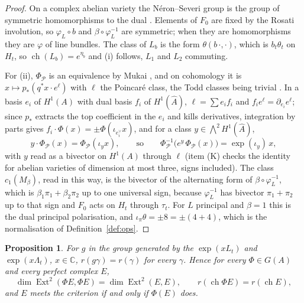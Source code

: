 \documentclass[11pt]{amsart}
\newtheorem{proposition}[theorem]{Proposition}
\theoremstyle{definition}
\theoremstyle{remark}
\newcommand{\CC}{\mathbb{C}}
\newcommand{\Av}{\widehat{A}}
\newcommand{\ch}{\operatorname{ch}}
\newcommand{\Ext}{\operatorname{Ext}}
\begin{document}
\begin{proof}
On a complex abelian variety the N\'eron--Severi group is the group of
symmetric homomorphisms to the dual \cite[\S2.5]{BL04}. Elements of $F_{0}$
are fixed by the Rosati involution, so $\varphi_{L}\circ b$ and
$\beta\circ\varphi_{L}^{-1}$ are symmetric; when they are homomorphisms they
are $\varphi$ of line bundles. The class of $L_{b}$ is the form
$\theta(b\,\cdot,\cdot)$, which is $b_{t}\theta_{t}$ on $H_{t}$, so
$\ch(L_{b})=e^{\eta_{b}}$ and (i) follows, $L_{1}$ and $L_{2}$ commuting.

For (ii), $\Phi_{\mathcal{P}}$ is an equivalence by Mukai \cite{Muk81}, and
on cohomology it is $x\mapsto p_{*}(q^{*}x\cdot e^{\ell})$ with $\ell$ the
Poincar\'e class, the Todd classes being trivial \cite[Proposition~6.1]{BMB}.
In a basis $e_{i}$ of $H^{1}(A)$ with dual basis $f_{i}$ of $H^{1}(\Av)$,
$\ell=\sum e_{i}f_{i}$ and $f_{i}e^{\ell}=\partial_{e_{i}}e^{\ell}$; since
$p_{*}$ extracts the top coefficient in the $e_{i}$ and kills derivatives,
integration by parts gives $f_{i}\cdot\Phi(x)=\pm\Phi(\iota_{e_{i}^{\vee}}x)$,
and for a class $y\in\bigwedge^{2}H^{1}(\Av)$,
\[
  y\cdot\Phi_{\mathcal{P}}(x)=\Phi_{\mathcal{P}}(\iota_{y}x),\qquad\text{so}\qquad
  \Phi_{\mathcal{P}}^{-1}\bigl(e^{y}\,\Phi_{\mathcal{P}}(x)\bigr)=\exp(\iota_{y})\,x ,
\]
with $y$ read as a bivector on $H^{1}(A)$ through $\ell$ (item (K) checks the
identity for abelian varieties of dimension at most three, signs included).
The class $c_{1}(M_{\beta})$, read in this way, is the bivector of the
alternating form of $\beta\circ\varphi_{L}^{-1}$, which is
$\beta_{1}\pi_{1}+\beta_{2}\pi_{2}$ up to one universal sign, because
$\varphi_{L}^{-1}$ has bivector $\pi_{1}+\pi_{2}$ up to that sign and $F_{0}$
acts on $H_{t}$ through $\tau_{t}$. For $L$ principal and $\beta=1$ this is the
dual principal polarisation, and $\iota_{\pi}\theta=\pm8=\pm(4+4)$, which is
the normalisation of Definition~\ref{def:ops}.
\end{proof}

\begin{proposition}\label{prop:invariance}
For $g$ in the group generated by the $\exp(xL_{t})$ and $\exp(x\Lambda_{t})$,
$x\in\CC$, $r(g\gamma)=r(\gamma)$ for every $\gamma$. Hence for every
$\Phi\in G(A)$ and every perfect complex $E$,
\[
  \dim\Ext^{2}(\Phi E,\Phi E)=\dim\Ext^{2}(E,E),\qquad
  r(\ch\Phi E)=r(\ch E),
\]
and $E$ meets the criterion if and only if $\Phi(E)$ does.
\end{proposition}
\end{document}
